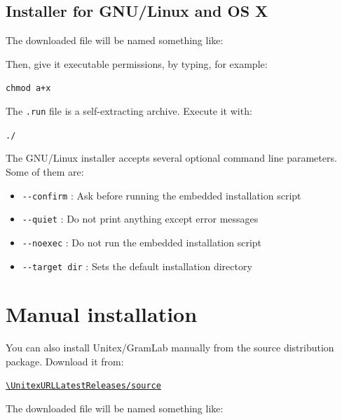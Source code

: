 \subsection{Installer for GNU/Linux and OS X}
The downloaded file will be named something like:

\begin{flushleft}
{\tt \UnitexPackageLinux{}}
{\tt \UnitexPackageLinuxSF{}}
\end{flushleft}

\noindent Then, give it executable permissions, by typing, for example:

\begin{flushleft}
{\tt chmod a+x \UnitexPackageLinux{}}
\end{flushleft}

\noindent The \verb+.run+ file is a self-extracting archive. Execute it with:

\begin{flushleft}
{\tt ./\UnitexPackageLinux{}}
\end{flushleft}

\begin{samepage}
\noindent The GNU/Linux installer accepts several optional command line parameters. Some of them are:

\begin{itemize}
\itemsep1pt\parskip0pt
\item
  \texttt{-\/-confirm} : Ask before running the embedded installation
  script\\
\item
  \texttt{-\/-quiet} : Do not print anything except error messages\\
\item
  \texttt{-\/-noexec} : Do not run the embedded installation script\\
\item
  \texttt{-\/-target dir} : Sets the default installation directory
\end{itemize}
\end{samepage}

\section{Manual installation}

\begin{samepage}

You can also install Unitex/GramLab manually from the source distribution package. Download it from:
\nopagebreak
\begin{center}
{\tt\url{\UnitexURLLatestReleases/source}}
\end{center}

\noindent The downloaded file will be named something like:
\begin{flushleft}
{\tt \UnitexPackageSource{}}
\end{flushleft}

\end{samepage}

